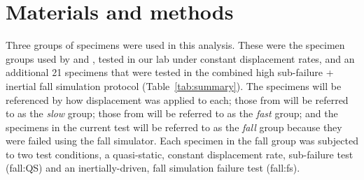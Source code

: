 \section{Materials and methods}
Three groups of specimens were used in this analysis.
These were the specimen groups used by \citet{de_bakker_during_2009} and \citet{nishiyama_proximal_2013}, tested in our lab under constant displacement rates, and an additional 21 specimens that were tested in the combined high sub-failure + inertial fall simulation protocol (Table~\ref{tab:summary}).
The specimens will be referenced by how displacement was applied to each; those from \citet{nishiyama_proximal_2013} will be referred to as the \textit{slow} group; those from \citet{de_bakker_during_2009} will be referred to as the \textit{fast} group; and the specimens in the current test will be referred to as the \textit{fall} group because they were failed using the fall simulator.
Each specimen in the fall group was subjected to two test conditions, a quasi-static, constant displacement rate, sub-failure test (fall:\ac{QS}) and an inertially-driven, fall simulation failure test (fall:\ac{fs}).

